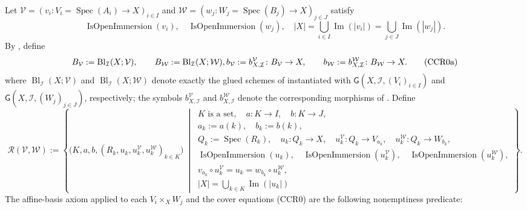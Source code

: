 \begin{definition}
  Let
  \(\mathcal V=(v_i\colon V_i=\operatorname{Spec}(A_i)\to X)_{i\in I}\)
  and
  \(\mathcal W=(w_j\colon W_j=\operatorname{Spec}(B_j)\to X)_{j\in J}\)
  satisfy
  \[
    \operatorname{IsOpenImmersion}(v_i),\quad
    \operatorname{IsOpenImmersion}(w_j),\quad
    |X|=\bigcup_{i\in I}\operatorname{Im}(|v_i|)
       =\bigcup_{j\in J}\operatorname{Im}(|w_j|).                  \tag{CCR0}
  \]
  By ,
  define
  \[
    B_{\mathcal V}:=
      \operatorname{Bl}_{\mathcal I}(X;\mathcal V),\qquad
    B_{\mathcal W}:=
      \operatorname{Bl}_{\mathcal I}(X;\mathcal W),\\
    b_{\mathcal V}:=b_{X,\mathcal I}^{\mathcal V}
      \colon B_{\mathcal V}\to X,\qquad
    b_{\mathcal W}:=b_{X,\mathcal I}^{\mathcal W}
      \colon B_{\mathcal W}\to X.                               \tag{CCR0a}
  \]
  where
  $\operatorname{Bl}_{\mathcal I}(X;\mathcal V)$ and
  $\operatorname{Bl}_{\mathcal I}(X;\mathcal W)$ denote exactly the glued
  schemes of  instantiated with
  $\mathsf G(X,\mathcal I,(V_i)_{i\in I})$ and
  $\mathsf G(X,\mathcal I,(W_j)_{j\in J})$, respectively; the symbols
  $b_{X,\mathcal I}^{\mathcal V}$ and
  $b_{X,\mathcal I}^{\mathcal W}$ denote the corresponding morphisms of
  .
  Define
  \[
    \mathscr R(\mathcal V,\mathcal W):=
    \left\{\bigl(K,a,b,(R_k,u_k,u_k^{\mathcal V},
        u_k^{\mathcal W})_{k\in K}\bigr)\ \middle|\
    \begin{array}{l}
      K\text{ is a set},\quad a\colon K\to I,\quad b\colon K\to J,\\
      a_k:=a(k),\quad b_k:=b(k),\\
      Q_k:=\operatorname{Spec}(R_k),\quad
      u_k\colon Q_k\to X,\quad
      u_k^{\mathcal V}\colon Q_k\to V_{a_k},\quad
      u_k^{\mathcal W}\colon Q_k\to W_{b_k},\\
      \operatorname{IsOpenImmersion}(u_k),\quad
      \operatorname{IsOpenImmersion}(u_k^{\mathcal V}),\quad
      \operatorname{IsOpenImmersion}(u_k^{\mathcal W}),\\
      v_{a_k}\circ u_k^{\mathcal V}=u_k
        =w_{b_k}\circ u_k^{\mathcal W},\\
      |X|=\displaystyle\bigcup_{k\in K}\operatorname{Im}(|u_k|)
    \end{array}\right\}.                                           \tag{CCR1}
  \]
  The affine-basis axiom applied to each
  \(V_i\times_XW_j\) and the cover equations (CCR0) are the following
  nonemptiness predicate:

\end{definition}
